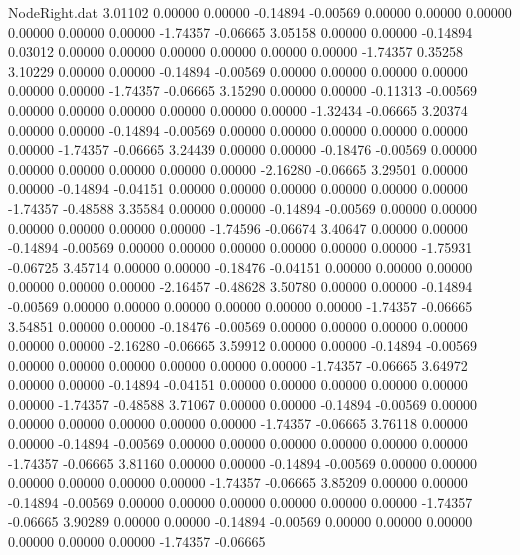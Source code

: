 \begin{filecontents}{NodeRight.dat}
   3.01102    0.00000    0.00000    -0.14894   -0.00569    0.00000    0.00000    0.00000    0.00000    0.00000    0.00000   -1.74357   -0.06665
   3.05158    0.00000    0.00000    -0.14894    0.03012    0.00000    0.00000    0.00000    0.00000    0.00000    0.00000   -1.74357    0.35258
   3.10229    0.00000    0.00000    -0.14894   -0.00569    0.00000    0.00000    0.00000    0.00000    0.00000    0.00000   -1.74357   -0.06665
   3.15290    0.00000    0.00000    -0.11313   -0.00569    0.00000    0.00000    0.00000    0.00000    0.00000    0.00000   -1.32434   -0.06665
   3.20374    0.00000    0.00000    -0.14894   -0.00569    0.00000    0.00000    0.00000    0.00000    0.00000    0.00000   -1.74357   -0.06665
   3.24439    0.00000    0.00000    -0.18476   -0.00569    0.00000    0.00000    0.00000    0.00000    0.00000    0.00000   -2.16280   -0.06665
   3.29501    0.00000    0.00000    -0.14894   -0.04151    0.00000    0.00000    0.00000    0.00000    0.00000    0.00000   -1.74357   -0.48588
   3.35584    0.00000    0.00000    -0.14894   -0.00569    0.00000    0.00000    0.00000    0.00000    0.00000    0.00000   -1.74596   -0.06674
   3.40647    0.00000    0.00000    -0.14894   -0.00569    0.00000    0.00000    0.00000    0.00000    0.00000    0.00000   -1.75931   -0.06725
   3.45714    0.00000    0.00000    -0.18476   -0.04151    0.00000    0.00000    0.00000    0.00000    0.00000    0.00000   -2.16457   -0.48628
   3.50780    0.00000    0.00000    -0.14894   -0.00569    0.00000    0.00000    0.00000    0.00000    0.00000    0.00000   -1.74357   -0.06665
   3.54851    0.00000    0.00000    -0.18476   -0.00569    0.00000    0.00000    0.00000    0.00000    0.00000    0.00000   -2.16280   -0.06665
   3.59912    0.00000    0.00000    -0.14894   -0.00569    0.00000    0.00000    0.00000    0.00000    0.00000    0.00000   -1.74357   -0.06665
   3.64972    0.00000    0.00000    -0.14894   -0.04151    0.00000    0.00000    0.00000    0.00000    0.00000    0.00000   -1.74357   -0.48588
   3.71067    0.00000    0.00000    -0.14894   -0.00569    0.00000    0.00000    0.00000    0.00000    0.00000    0.00000   -1.74357   -0.06665
   3.76118    0.00000    0.00000    -0.14894   -0.00569    0.00000    0.00000    0.00000    0.00000    0.00000    0.00000   -1.74357   -0.06665
   3.81160    0.00000    0.00000    -0.14894   -0.00569    0.00000    0.00000    0.00000    0.00000    0.00000    0.00000   -1.74357   -0.06665
   3.85209    0.00000    0.00000    -0.14894   -0.00569    0.00000    0.00000    0.00000    0.00000    0.00000    0.00000   -1.74357   -0.06665
   3.90289    0.00000    0.00000    -0.14894   -0.00569    0.00000    0.00000    0.00000    0.00000    0.00000    0.00000   -1.74357   -0.06665

\end{filecontents}
